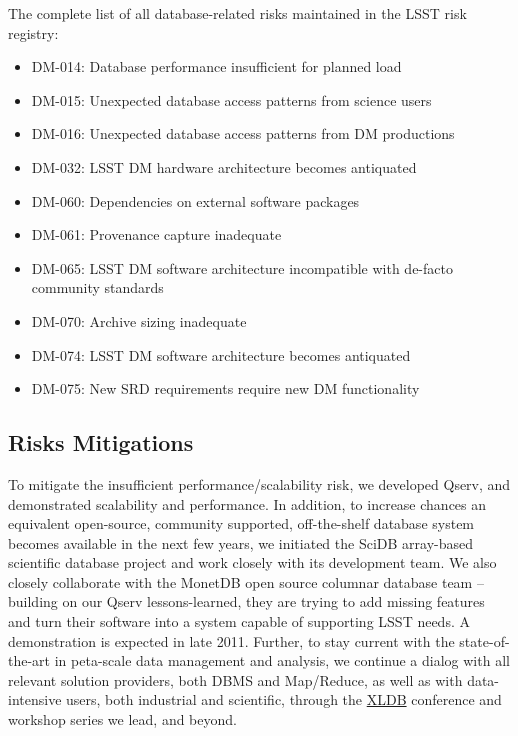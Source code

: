 \documentclass[DM,lsstdraft,toc]{lsstdoc}
\begin{document}
The complete list of all database-related risks maintained in the LSST
risk registry:

\begin{itemize}
\item
  DM-014: Database performance insufficient for planned load
\item
  DM-015: Unexpected database access patterns from science users
\item
  DM-016: Unexpected database access patterns from DM productions
\item
  DM-032: LSST DM hardware architecture becomes antiquated
\item
  DM-060: Dependencies on external software packages
\item
  DM-061: Provenance capture inadequate
\item
  DM-065: LSST DM software architecture incompatible with de-facto
  community standards
\item
  DM-070: Archive sizing inadequate
\item
  DM-074: LSST DM software architecture becomes antiquated
\item
  DM-075: New SRD requirements require new DM functionality
\end{itemize}

\subsection{Risks Mitigations}\label{risks-mitigations}

To mitigate the insufficient performance/scalability risk, we developed
Qserv, and demonstrated scalability and performance. In addition, to
increase chances an equivalent open-source, community supported,
off-the-shelf database system becomes available in the next few years,
we initiated the SciDB array-based scientific database project and work
closely with its development team. We also closely collaborate with the
MonetDB open source columnar database team -- building on our Qserv
lessons-learned, they are trying to add missing features and turn their
software into a system capable of supporting LSST needs. A demonstration
is expected in late 2011. Further, to stay current with the
state-of-the-art in peta-scale data management and analysis, we continue
a dialog with all relevant solution providers, both DBMS and Map/Reduce,
as well as with data-intensive users, both industrial and scientific,
through the \href{http://xldb.org}{XLDB} conference and workshop series
we lead, and beyond.
\end{document}
